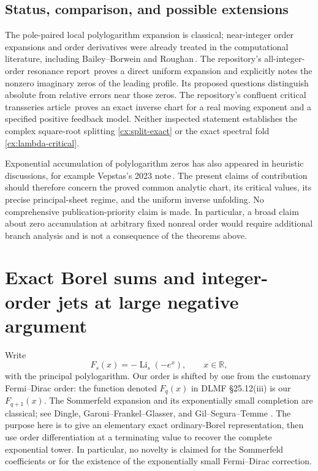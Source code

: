 \documentclass[11pt,a4paper]{article}
\numberwithin{equation}{section}
\theoremstyle{definition}
\theoremstyle{remark}
\begin{document}
\subsection{Status, comparison, and possible extensions}

The pole-paired local polylogarithm expansion is classical; near-integer
order expansions and order derivatives were already treated in the
computational literature, including Bailey--Borwein and Roughan\,\cite{bailey-borwein,roughan}.
The repository's all-integer-order resonance report\,\cite{repo-resonance} proves a direct
uniform expansion and explicitly notes the nonzero imaginary zeros of
the leading profile.  Its proposed questions distinguish absolute from
relative errors near those zeros.  The repository's confluent critical
transseries article\,\cite{repo-confluent} proves an exact inverse chart for a real moving
exponent and a specified positive feedback model.  Neither inspected
statement establishes the complex square-root splitting
\eqref{cx:split-exact} or the exact spectral fold
\eqref{cx:lambda-critical}.

Exponential accumulation of polylogarithm zeros has also appeared in
heuristic discussions, for example Vepstas's 2023 note\,\cite{vepstas}.  The present
claims of contribution should therefore concern the proved common
analytic chart, its critical values, its precise principal-sheet regime,
and the uniform inverse unfolding.  No comprehensive publication-priority
claim is made.  In particular, a broad claim about zero accumulation at
arbitrary fixed nonreal order would require additional branch analysis
and is not a consequence of the theorems above.



\section{Exact Borel sums and integer-order jets at large negative argument}
\label{sec:borel-fermi}

Write
\begin{equation}\label{eq:borel-F-def}
 F_s(x)=-\operatorname{Li}_s(-e^x),\qquad x\in\mathbb R,
\end{equation}
with the principal polylogarithm. Our order is shifted by one from the
customary Fermi--Dirac order: the function denoted $F_q(x)$ in DLMF
\S25.12(iii) is our $F_{q+1}(x)$.
The Sommerfeld expansion and its exponentially small completion are
classical; see Dingle, Garoni--Frankel--Glasser, and Gil--Segura--Temme
\cite{dingle,garoni,gil}.
The purpose here is to give an elementary exact ordinary-Borel
representation, then use order differentiation at a terminating value
to recover the complete exponential tower. In particular, no novelty is
claimed for the Sommerfeld coefficients or for the existence of the
exponentially small Fermi--Dirac correction.
\end{document}
